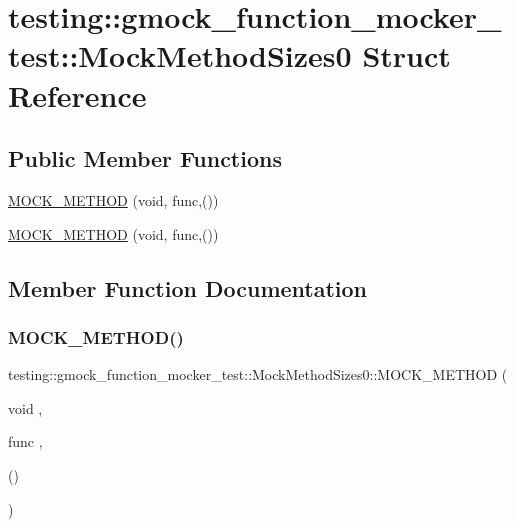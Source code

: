 \hypertarget{structtesting_1_1gmock__function__mocker__test_1_1_mock_method_sizes0}{}\section{testing\+::gmock\+\_\+function\+\_\+mocker\+\_\+test\+::Mock\+Method\+Sizes0 Struct Reference}
\label{structtesting_1_1gmock__function__mocker__test_1_1_mock_method_sizes0}
\subsection*{Public Member Functions}
\begin{DoxyCompactItemize}
\item 
\mbox{\hyperlink{structtesting_1_1gmock__function__mocker__test_1_1_mock_method_sizes0_ab38f39ad908e506f699b3cd8c1b9a218}{M\+O\+C\+K\+\_\+\+M\+E\+T\+H\+OD}} (void, func,())
\item 
\mbox{\hyperlink{structtesting_1_1gmock__function__mocker__test_1_1_mock_method_sizes0_ab38f39ad908e506f699b3cd8c1b9a218}{M\+O\+C\+K\+\_\+\+M\+E\+T\+H\+OD}} (void, func,())
\end{DoxyCompactItemize}


\subsection{Member Function Documentation}
\mbox{\label{structtesting_1_1gmock__function__mocker__test_1_1_mock_method_sizes0_ab38f39ad908e506f699b3cd8c1b9a218}} 
\subsubsection{\texorpdfstring{MOCK\_METHOD()}{MOCK\_METHOD()}\hspace{0.1cm}{\footnotesize\ttfamily [1/2]}}
{\footnotesize\ttfamily testing\+::gmock\+\_\+function\+\_\+mocker\+\_\+test\+::\+Mock\+Method\+Sizes0\+::\+M\+O\+C\+K\+\_\+\+M\+E\+T\+H\+OD (\begin{DoxyParamCaption}\item[{void}]{,  }\item[{func}]{,  }\item[{()}]{ }\end{DoxyParamCaption})}

